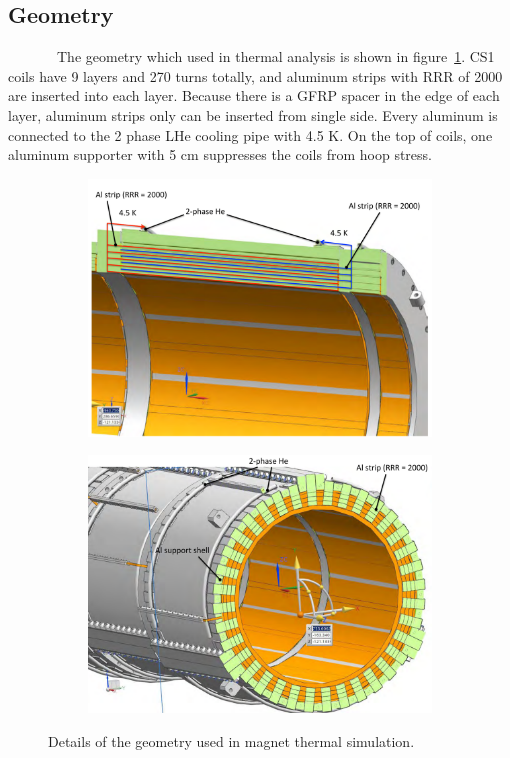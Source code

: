   \subsection{Geometry}
~~~~~~~The geometry which used in thermal analysis is shown in figure~\ref{4geo}.
CS1 coils have 9 layers and 270 turns totally, and aluminum strips with RRR of 2000 are inserted into each layer.
Because there is a GFRP spacer in the edge of each layer, aluminum strips only can be inserted from single side.
Every aluminum is connected to the 2 phase LHe cooling pipe with 4.5 K.
On the top of coils, one aluminum supporter with 5 cm suppresses the coils from hoop stress.
 \begin{figure}[H]
   \begin{subfigure}{0.3\textwidth}
    \centering
    \includegraphics[scale=0.29]{chapter5/fig/geo.pdf}
   \end{subfigure}
   \hspace{0.2\textwidth}
   \begin{subfigure}{0.3\textwidth}
    \centering
	\includegraphics[scale=0.29]{chapter5/fig/geo2.pdf}
   \end{subfigure}
   \caption{Details of the geometry used in magnet thermal simulation.}
   \label{4geo}
  \end{figure}
 
